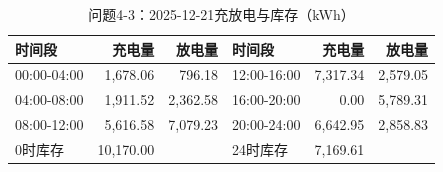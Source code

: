\begin{table}[H]\centering\small\caption{问题4-3：2025-12-21充放电与库存（kWh）}\label{tab:q4_320251221b}
\begin{tabular}{lrrlrr}\toprule
时间段 & 充电量 & 放电量 & 时间段 & 充电量 & 放电量\\\midrule
00:00-04:00 & 1,678.06 & 796.18 & 12:00-16:00 & 7,317.34 & 2,579.05\\
04:00-08:00 & 1,911.52 & 2,362.58 & 16:00-20:00 & 0.00 & 5,789.31\\
08:00-12:00 & 5,616.58 & 7,079.23 & 20:00-24:00 & 6,642.95 & 2,858.83\\
0时库存 & 10,170.00 &  & 24时库存 & 7,169.61 & \\
\bottomrule\end{tabular}\end{table}
